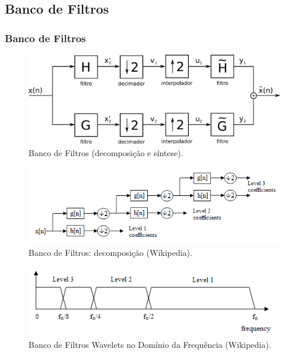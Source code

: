 \subsection{Banco de Filtros}
\begin{frame}[allowframebreaks]
  \frametitle{Banco de Filtros}
  \begin{figure}[hptb]
  \centering
  \includegraphics[width=.75\textwidth]{images/banco_filtros_comp.pdf}
  \caption{Banco de Filtros (decomposição e síntese).}
  \label{fig:filter_bank_complete}
  \end{figure}

  \framebreak

  \begin{figure}[hptb]
  \centering
  \includegraphics[width=.75\textwidth]{images/wavelets_filter_bank.png}
  \caption{Banco de Filtros: decomposição (Wikipedia).}
  \label{fig:filter_bank_dec}
  \end{figure}

  \framebreak

  \begin{figure}[hptb]
  \centering
  \includegraphics[width=.75\textwidth]{images/wavelets_filterbank_freq.png}
  \caption{Banco de Filtros Wavelets no Domínio da Frequência (Wikipedia).}
  \label{fig:wavelets_filterbank_freq}
  \end{figure}

  \framebreak


\end{frame}
